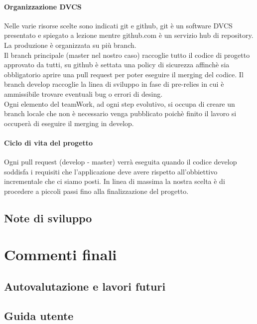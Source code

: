 \documentclass[a4paper,12pt]{report}
\begin{document}
\subsubsection{Organizzazione DVCS}
Nelle varie risorse scelte sono indicati git e github, git è un software DVCS presentato e spiegato a lezione mentre github.com è un servizio
hub di repository.
La produzione è organizzata su più branch.
\\Il branch principale (master nel nostro caso) raccoglie tutto il codice di progetto approvato da tutti, su github è settata una policy
di sicurezza affinchè sia obbligatorio aprire una pull request per poter eseguire il merging del codice.
Il branch develop raccoglie la linea di sviluppo in fase di pre-relies in cui è ammissibile trovare eventuali bug o errori di desing.
\\Ogni elemento del teamWork, ad ogni step evolutivo, si occupa di creare un branch locale che non è necessario venga pubblicato poichè finito
il lavoro si occuperà di eseguire il merging  in develop.
\subsubsection{Ciclo di vita del progetto}
Ogni pull request (develop - master) verrà eseguita quando il codice develop soddisfa i requisiti che l'applicazione deve avere rispetto
all'obbiettivo incrementale che ci siamo posti.
In linea di massima la nostra scelta è di procedere a piccoli passi fino alla finalizzazione del progetto.
\section{Note di sviluppo}
\chapter{Commenti finali}
\section{Autovalutazione e lavori futuri}

\appendix
\section{Guida utente}
\end{document}
